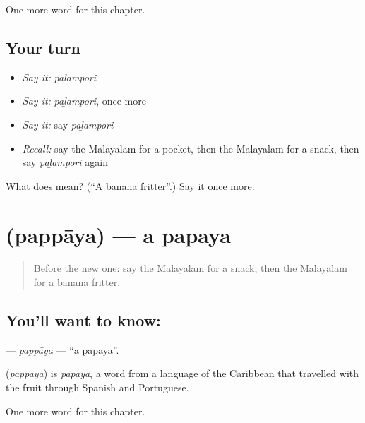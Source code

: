 \begin{grammarlens}[title={What you've built}]
One more word for this chapter.
\end{grammarlens}

\subsection*{Your turn}
\begin{itemize}
\raggedright
  \item \emph{Say it:} \emph{paḻampori}
  \item \emph{Say it:} \emph{paḻampori}, once more
  \item \emph{Say it:} say \emph{paḻampori}
  \item \emph{Recall:} say the Malayalam for a pocket, then the Malayalam for a snack, then say \emph{paḻampori} again
\end{itemize}

\begin{tcolorbox}[breakable,colback=teal!4,colframe=teal!35!black,title={Before you move on}]
What does  mean? (\textquotedblleft{}A banana fritter\textquotedblright{}.) Say it once more.
\end{tcolorbox}
\section[\texorpdfstring{\ml{പപ്പായ} (pappāya)}{പപ്പായ (pappāya)}]{ (pappāya) — a papaya}

\label{lesson:ML-C287-pappaya}



\begin{quote}
Before the new one: say the Malayalam for a snack, then the Malayalam for a banana fritter.
\end{quote}

\subsection*{You'll want to know: }
\textbf{} — \emph{pappāya} — \textquotedblleft{}a papaya\textquotedblright{}.

\begin{cousinweb}
\textbf{} (\emph{pappāya}) is \emph{papaya}, a word from a language of the Caribbean that travelled with the fruit through Spanish and Portuguese.
\end{cousinweb}

\begin{grammarlens}[title={What you've built}]
One more word for this chapter.
\end{grammarlens}

